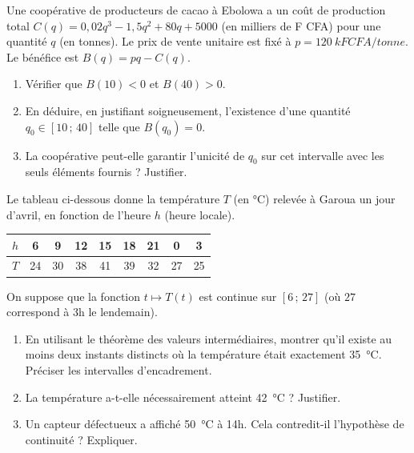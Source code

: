 \documentclass[11pt]{article}
\begin{document}
\begin{exercice}
Une coopérative de producteurs de cacao à Ebolowa a un coût de production total $C(q) = 0,02q^3 - 1,5q^2 + 80q + 5000$ (en milliers de F CFA) pour une quantité $q$ (en tonnes). Le prix de vente unitaire est fixé à $p = \SI{120}{kF CFA/tonne}$. Le bénéfice est $B(q) = pq - C(q)$.
\begin{enumerate}
\item Vérifier que $B(10) < 0$ et $B(40) > 0$.
\item En déduire, en justifiant soigneusement, l'existence d'une quantité $q_0 \in [10\,;\,40]$ telle que $B(q_0) = 0$.
\item La coopérative peut-elle garantir l'unicité de $q_0$ sur cet intervalle avec les seuls éléments fournis ? Justifier.
\end{enumerate}
\end{exercice}

\begin{exercice}
Le tableau ci-dessous donne la température $T$ (en \si{\celsius}) relevée à Garoua un jour d'avril, en fonction de l'heure $h$ (heure locale).

\begin{tabular}{|c|c|c|c|c|c|c|c|c|}
\hline
$h$ & 6 & 9 & 12 & 15 & 18 & 21 & 0 & 3 \\
\hline
$T$ & 24 & 30 & 38 & 41 & 39 & 32 & 27 & 25 \\
\hline
\end{tabular}

On suppose que la fonction $t \mapsto T(t)$ est continue sur $[6\,;\,27]$ (où $27$ correspond à 3h le lendemain).
\begin{enumerate}
\item En utilisant le théorème des valeurs intermédiaires, montrer qu'il existe au moins deux instants distincts où la température était exactement \SI{35}{\celsius}. Préciser les intervalles d'encadrement.
\item La température a-t-elle nécessairement atteint \SI{42}{\celsius} ? Justifier.
\item Un capteur défectueux a affiché \SI{50}{\celsius} à 14h. Cela contredit-il l'hypothèse de continuité ? Expliquer.
\end{enumerate}
\end{exercice}
\end{document}
